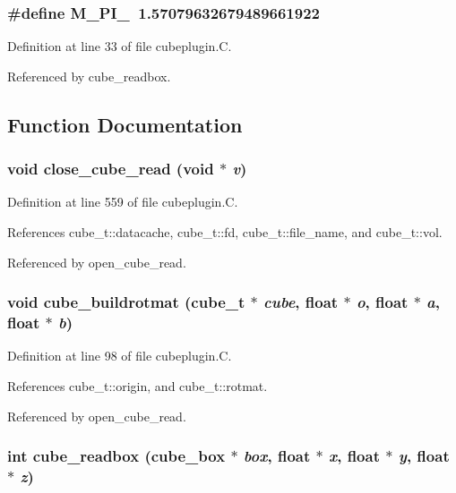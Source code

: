 \subsubsection{\setlength{\rightskip}{0pt plus 5cm}\#define M\_\-PI\_\ 1.57079632679489661922}\label{cubeplugin_8C_a0}




Definition at line 33 of file cubeplugin.C.

Referenced by cube\_\-readbox.

\subsection{Function Documentation}
\subsubsection{\setlength{\rightskip}{0pt plus 5cm}void close\_\-cube\_\-read (void $\ast$ {\em v})\hspace{0.3cm}{\tt  [static]}}\label{cubeplugin_8C_a6}




Definition at line 559 of file cubeplugin.C.

References cube\_\-t::datacache, cube\_\-t::fd, cube\_\-t::file\_\-name, and cube\_\-t::vol.

Referenced by open\_\-cube\_\-read.
\subsubsection{\setlength{\rightskip}{0pt plus 5cm}void cube\_\-buildrotmat ({\bf cube\_\-t} $\ast$ {\em cube}, float $\ast$ {\em o}, float $\ast$ {\em a}, float $\ast$ {\em b})\hspace{0.3cm}{\tt  [static]}}\label{cubeplugin_8C_a4}




Definition at line 98 of file cubeplugin.C.

References cube\_\-t::origin, and cube\_\-t::rotmat.

Referenced by open\_\-cube\_\-read.
\subsubsection{\setlength{\rightskip}{0pt plus 5cm}int cube\_\-readbox ({\bf cube\_\-box} $\ast$ {\em box}, float $\ast$ {\em x}, float $\ast$ {\em y}, float $\ast$ {\em z})\hspace{0.3cm}{\tt  [static]}}\label{cubeplugin_8C_a3}




